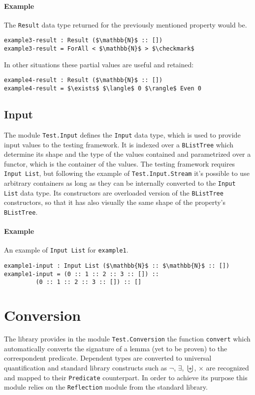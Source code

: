 \documentclass[10pt,a4paper]{article}
\begin{document}
\paragraph{Example} The \texttt{Result} data type returned for the previously mentioned property would be.

\begin{lstlisting}
example3-result : Result ($\mathbb{N}$ :: [])
example3-result = ForAll < $\mathbb{N}$ > $\checkmark$
\end{lstlisting}
In other situations these partial values are useful and retained:
\begin{lstlisting}
example4-result : Result ($\mathbb{N}$ :: [])
example4-result = $\exists$ $\langle$ 0 $\rangle$ Even 0
\end{lstlisting}

\subsection{Input}
The module \texttt{Test.Input} defines the \texttt{Input} data type, which is used to provide input values to the testing framework.
It is indexed over a \texttt{BListTree} which determine its shape and the type of the values contained and parametrized over a functor, which is the container of the values.
The testing framework requires \texttt{Input List}, but following the example of \texttt{Test.Input.Stream} it's possible to use arbitrary containers as long as they can be internally converted to the \texttt{Input List} data type.
Its constructors are overloaded version of the \texttt{BListTree} constructors, so that it has also visually the same shape of the property's \texttt{BListTree}.

\paragraph{Example} An example of \texttt{Input List} for \texttt{example1}.
\begin{lstlisting}
example1-input : Input List ($\mathbb{N}$ :: $\mathbb{N}$ :: [])
example1-input = (0 :: 1 :: 2 :: 3 :: []) :: 
		 (0 :: 1 :: 2 :: 3 :: []) :: []
\end{lstlisting}

\section{Conversion}
The library provides in the module \texttt{Test.Conversion} the function \texttt{convert} which automatically converts the signature of a lemma (yet to be proven) to the correspondent predicate. Dependent types are converted to universal quantification and standard library constructs such as $\neg$, $\exists$, $\biguplus$, $\times$ are recognized and mapped to their \texttt{Predicate} counterpart.
In order to achieve its purpose this module relies on the \texttt{Reflection} module from the standard library.
\end{document}

